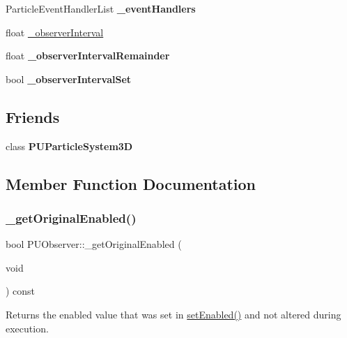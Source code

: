 \begin{DoxyCompactItemize}
Particle\+Event\+Handler\+List {\bfseries \+\_\+event\+Handlers}
\item 
float \hyperlink{classPUObserver_a3e5a3237291c9ac55ae24352729efc10}{\+\_\+observer\+Interval}
\item 
\mbox{\label{classPUObserver_aa0173ea4c1893c2d0c21b1b1d3c2798f}} 
float {\bfseries \+\_\+observer\+Interval\+Remainder}
\item 
\mbox{\label{classPUObserver_aed859d7d810afab7cac25d7086f7a6d0}} 
bool {\bfseries \+\_\+observer\+Interval\+Set}
\end{DoxyCompactItemize}
\subsection*{Friends}
\begin{DoxyCompactItemize}
\item 
\mbox{\label{classPUObserver_a6facc234295c573636e9e1f78b0777c8}} 
class {\bfseries P\+U\+Particle\+System3D}
\end{DoxyCompactItemize}


\subsection{Member Function Documentation}
\mbox{\label{classPUObserver_a380858d42cdfa11c854f91bfef9d8395}} 
\subsubsection{\texorpdfstring{\+\_\+get\+Original\+Enabled()}{\_getOriginalEnabled()}\hspace{0.1cm}{\footnotesize\ttfamily [1/2]}}
{\footnotesize\ttfamily bool P\+U\+Observer\+::\+\_\+get\+Original\+Enabled (\begin{DoxyParamCaption}\item[{void}]{ }\end{DoxyParamCaption}) const}

Returns the \textquotesingle{}enabled\textquotesingle{} value that was set in \hyperlink{classPUObserver_a5f2b1a071d5579cac1cfbc09b9871853}{set\+Enabled()} and not altered during execution. \mbox{\label{classPUObserver_a380858d42cdfa11c854f91bfef9d8395}} 
